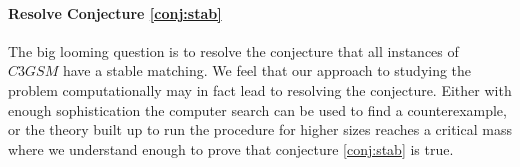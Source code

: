 \paragraph{Resolve Conjecture \ref{conj:stab}}
The big looming question is to resolve the conjecture that all instances of $C3GSM$ have a stable matching. We feel that our approach to studying the problem computationally may in fact lead to resolving the conjecture. Either with enough sophistication the computer search can be used to find a counterexample, or the theory built up to run the procedure for higher sizes reaches a critical mass where we understand enough to prove that conjecture \ref{conj:stab} is true.